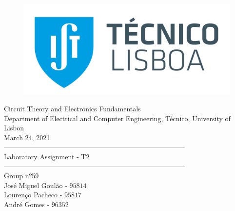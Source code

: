 
\thispagestyle {empty}


\begin{figure}[ht]
	\centering
	\includegraphics[width = 0.5\linewidth]{ist_foto}
\end{figure}


\begin{center}

	\vspace{2cm}
	{\FontLb Circuit Theory and Electronics Fundamentals} \\

	\vspace{0.5cm}
	{\FontSn Department of Electrical and Computer Engineering, Técnico, University of Lisbon} \\

	\vspace{0.5cm}
	{\FontSn March 24, 2021} \\

	\vspace{1cm}
	{\FontLb --------------------------------------------------------------------------------} \\
	\vspace{0.1cm}
	{\FontLb Laboratory Assignment - T2} \\
	{\FontLb --------------------------------------------------------------------------------} \\

	\vspace{1cm}
	{\FontMb Group nº59} \\
	\vspace{0.25cm}
	{\FontSn José Miguel Goulão - $95814$} \\
	{\FontSn Lourenço Pacheco - $95817$} \\
	{\FontSn André Gomes - $96352$} \\

	\vspace{1cm}

\end{center}

